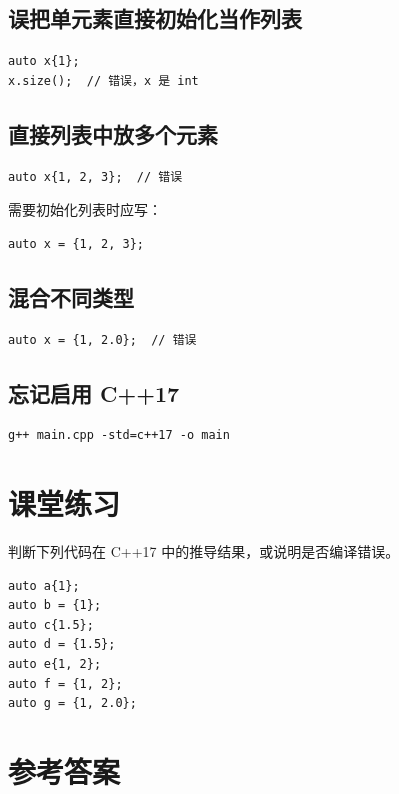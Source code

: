 \documentclass[UTF8,12pt,a4paper]{ctexart}
\begin{document}
\subsection{误把单元素直接初始化当作列表}

\begin{lstlisting}
auto x{1};
x.size();  // 错误，x 是 int
\end{lstlisting}

\subsection{直接列表中放多个元素}

\begin{lstlisting}
auto x{1, 2, 3};  // 错误
\end{lstlisting}

需要初始化列表时应写：

\begin{lstlisting}
auto x = {1, 2, 3};
\end{lstlisting}

\subsection{混合不同类型}

\begin{lstlisting}
auto x = {1, 2.0};  // 错误
\end{lstlisting}

\subsection{忘记启用 C++17}

\begin{verbatim}
g++ main.cpp -std=c++17 -o main
\end{verbatim}

\section{课堂练习}

判断下列代码在 C++17 中的推导结果，或说明是否编译错误。

\begin{lstlisting}
auto a{1};
auto b = {1};
auto c{1.5};
auto d = {1.5};
auto e{1, 2};
auto f = {1, 2};
auto g = {1, 2.0};
\end{lstlisting}

\section{参考答案}
\end{document}
